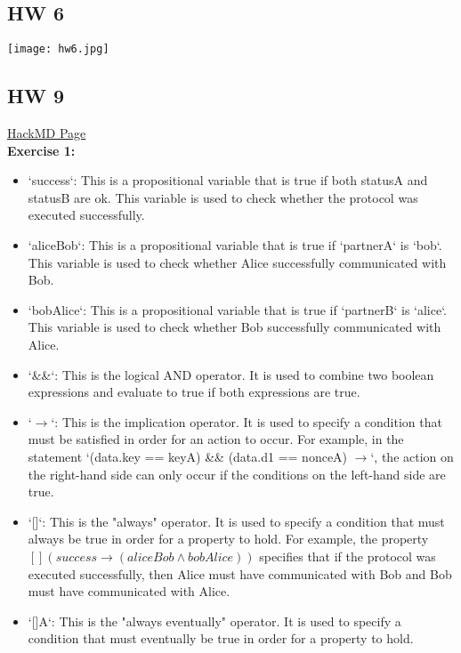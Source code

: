 \documentclass{article}
\theoremstyle{theorem}
\theoremstyle{definition}
\theoremstyle{remark}
\begin{document}
\subsection{HW 6}

    \texttt{[image: hw6.jpg]}

\subsection{HW 9}

\href{https://github.com/alexhkurz/algorithm-analysis-2023/blob/main/resources/model-checking/Needham-Schroeder.md}{HackMD Page}
\\

{\bf Exercise 1:}

\begin{itemize}
\item `success`: This is a propositional variable that is true if both statusA and statusB are ok. This variable is used to check whether the protocol was executed successfully.
\item `aliceBob`: This is a propositional variable that is true if `partnerA` is `bob`. This variable is used to check whether Alice successfully communicated with Bob.

\item `bobAlice`: This is a propositional variable that is true if `partnerB` is `alice`. This variable is used to check whether Bob successfully communicated with Alice.

\item `\&\&`: This is the logical AND operator. It is used to combine two boolean expressions and evaluate to true if both expressions are true.

\item `$\rightarrow$`: This is the implication operator. It is used to specify a condition that must be satisfied in order for an action to occur. For example, in the statement `(data.key == keyA) \&\& (data.d1 == nonceA) $\rightarrow$`, the action on the right-hand side can only occur if the conditions on the left-hand side are true.

\item `[]`: This is the "always" operator. It is used to specify a condition that must always be true in order for a property to hold. For example, the property $[] (success \rightarrow (aliceBob \land bobAlice))$ specifies that if the protocol was executed successfully, then Alice must have communicated with Bob and Bob must have communicated with Alice.

\item `[]A`: This is the "always eventually" operator. It is used to specify a condition that must eventually be true in order for a property to hold.

\end{itemize}
\end{document}
